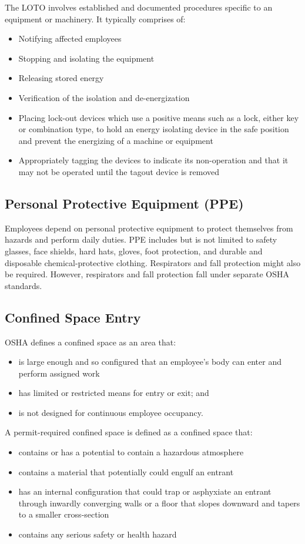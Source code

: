 The LOTO involves established and documented procedures specific to an equipment or machinery.  It typically comprises of:\\
\begin{itemize}
\item Notifying affected employees
\item Stopping and isolating the equipment
\item Releasing stored energy
\item Verification of the isolation and de-energization
\item Placing lock-out devices which use a positive means such as a lock, either key or combination type, to hold an energy isolating device in the safe position and prevent the energizing of a machine or equipment
\item Appropriately tagging the devices to indicate its non-operation and that it may not be operated until the tagout device is removed
\end{itemize}

\subsection{Personal Protective Equipment (PPE)}
Employees depend on personal protective equipment to protect themselves from hazards and perform daily duties. PPE includes but is not limited to safety glasses, face shields, hard hats, gloves, foot protection, and durable and disposable chemical-protective clothing. Respirators and fall protection might also be required. However, respirators and fall protection fall under separate OSHA standards. \\

\subsection{Confined Space Entry}
OSHA defines a confined space as an area that:
\begin{itemize} 
\item is large enough and so configured that an employee's body can enter and perform assigned work
\item has limited or restricted means for entry or exit; and
\item is not designed for continuous employee occupancy.
\end{itemize}
A permit-required confined space is defined as a confined space that:
\begin{itemize} 
\item contains or has a potential to contain a hazardous atmosphere
\item contains a material that potentially could engulf an entrant
\item has an internal configuration that could trap or asphyxiate an entrant through inwardly converging walls or a floor that slopes downward and tapers to a smaller cross-section
\item contains any serious safety or health hazard
\end{itemize}

